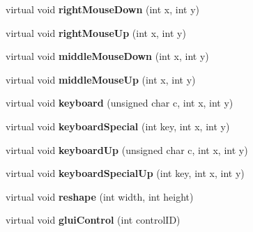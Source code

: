 \begin{DoxyCompactItemize}
\item 
\hypertarget{classBaseGfxApp_afa87e6a71220945e41f0424e540125d9}{virtual void {\bfseries right\-Mouse\-Down} (int x, int y)}\label{classBaseGfxApp_afa87e6a71220945e41f0424e540125d9}

\item 
\hypertarget{classBaseGfxApp_a812643d563522a993457dd565c33f8f6}{virtual void {\bfseries right\-Mouse\-Up} (int x, int y)}\label{classBaseGfxApp_a812643d563522a993457dd565c33f8f6}

\item 
\hypertarget{classBaseGfxApp_a2c98cae9bb5ad1fb1832a6d4812670f8}{virtual void {\bfseries middle\-Mouse\-Down} (int x, int y)}\label{classBaseGfxApp_a2c98cae9bb5ad1fb1832a6d4812670f8}

\item 
\hypertarget{classBaseGfxApp_a00fc05e8d9629b72302b5adf014bdb0c}{virtual void {\bfseries middle\-Mouse\-Up} (int x, int y)}\label{classBaseGfxApp_a00fc05e8d9629b72302b5adf014bdb0c}

\item 
\hypertarget{classBaseGfxApp_a6d91e0cb7a3d48cad33956efe7eb36ca}{virtual void {\bfseries keyboard} (unsigned char c, int x, int y)}\label{classBaseGfxApp_a6d91e0cb7a3d48cad33956efe7eb36ca}

\item 
\hypertarget{classBaseGfxApp_a345566e62c9e4ec3705ec4d1c4c75f1f}{virtual void {\bfseries keyboard\-Special} (int key, int x, int y)}\label{classBaseGfxApp_a345566e62c9e4ec3705ec4d1c4c75f1f}

\item 
\hypertarget{classBaseGfxApp_acc4a40ce11edd6b6660a19cb4802a2bf}{virtual void {\bfseries keyboard\-Up} (unsigned char c, int x, int y)}\label{classBaseGfxApp_acc4a40ce11edd6b6660a19cb4802a2bf}

\item 
\hypertarget{classBaseGfxApp_afd14b435ff93b1e7f461cb8bd1a6fd59}{virtual void {\bfseries keyboard\-Special\-Up} (int key, int x, int y)}\label{classBaseGfxApp_afd14b435ff93b1e7f461cb8bd1a6fd59}

\item 
\hypertarget{classBaseGfxApp_a5d8d5d778a8aecd7f5f8e9c87f4c3d20}{virtual void {\bfseries reshape} (int width, int height)}\label{classBaseGfxApp_a5d8d5d778a8aecd7f5f8e9c87f4c3d20}

\item 
\hypertarget{classBaseGfxApp_a2978a7c358794c67df73b66776b2cef3}{virtual void {\bfseries glui\-Control} (int control\-I\-D)}\label{classBaseGfxApp_a2978a7c358794c67df73b66776b2cef3}


\end{DoxyCompactItemize}
